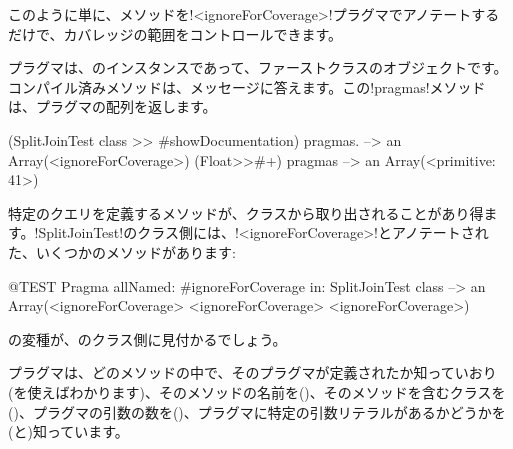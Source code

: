 \documentclass[a4paper,10pt,twoside]{book}
\begin{document}
このように単に、メソッドを\ct!<ignoreForCoverage>!プラグマでアノテートするだけで、カバレッジの範囲をコントロールできます。


%	


プラグマは、のインスタンスであって、ファーストクラスのオブジェクトです。コンパイル済みメソッドは、メッセージに答えます。この\ct!pragmas!メソッドは、プラグマの配列を返します。

\begin{code}{}
(SplitJoinTest class >> #showDocumentation) pragmas.
  --> an Array(<ignoreForCoverage>)
(Float>>#+) pragmas --> an Array(<primitive: 41>)
\end{code}

特定のクエリを定義するメソッドが、クラスから取り出されることがあり得ます。\ct!SplitJoinTest!のクラス側には、\ct!<ignoreForCoverage>!とアノテートされた、いくつかのメソッドがあります: %

\begin{code}{@TEST}
Pragma allNamed: #ignoreForCoverage in: SplitJoinTest class  --> an Array(<ignoreForCoverage> <ignoreForCoverage> <ignoreForCoverage>)
\end{code}

の変種が、のクラス側に見付かるでしょう。

プラグマは、どのメソッドの中で、そのプラグマが定義されたか知っていおり(を使えばわかります)、そのメソッドの名前を()、そのメソッドを含むクラスを()、プラグマの引数の数を()、プラグマに特定の引数リテラルがあるかどうかを(と)知っています。 

\end{document}
